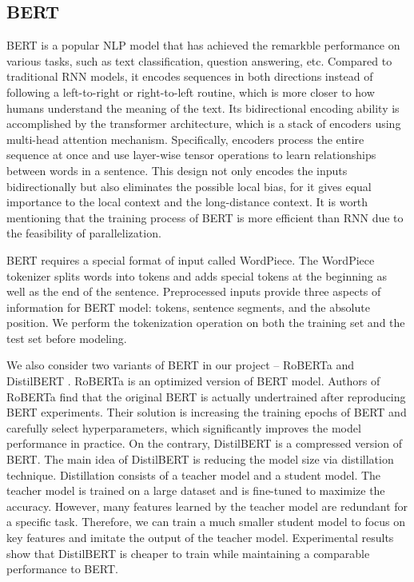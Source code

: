 \documentclass[runningheads]{llncs}
\begin{document}
\subsection{BERT}
BERT \cite{bert} is a popular NLP model that has achieved the remarkble performance on various tasks, such as text classification, question answering, etc. Compared to traditional RNN models, it encodes sequences in both directions instead of following a left-to-right or right-to-left routine, which is more closer to how humans understand the meaning of the text. Its bidirectional encoding ability is accomplished by the transformer architecture, which is a stack of encoders using multi-head attention mechanism. Specifically, encoders process the entire sequence at once and use layer-wise tensor operations to learn relationships between words in a sentence. This design not only encodes the inputs bidirectionally but also eliminates the possible local bias, for it gives equal importance to the local context and the long-distance context. It is worth mentioning that the training process of BERT is more efficient than RNN due to the feasibility of parallelization.

BERT requires a special format of input called WordPiece. The WordPiece tokenizer splits words into tokens and adds special tokens at the beginning as well as the end of the sentence. Preprocessed inputs provide three aspects of information for BERT model: tokens, sentence segments, and the absolute position. We perform the tokenization operation on both the training set and the test set before modeling.

We also consider two variants of BERT in our project -- RoBERTa \cite{roberta} and DistilBERT \cite{distilbert}. RoBERTa is an optimized version of BERT model. Authors of RoBERTa find that the original BERT is actually undertrained after reproducing BERT experiments. Their solution is increasing the training epochs of BERT and carefully select hyperparameters, which significantly improves the model performance in practice. On the contrary, DistilBERT is a compressed version of BERT. The main idea of DistilBERT is reducing the model size via distillation technique. Distillation consists of a teacher model and a student model. The teacher model is trained on a large dataset and is fine-tuned to maximize the accuracy. However, many features learned by the teacher model are redundant for a specific task. Therefore, we can train a much smaller student model to focus on key features and imitate the output of the teacher model. Experimental results show that DistilBERT is cheaper to train while maintaining a comparable performance to BERT.
\end{document}
